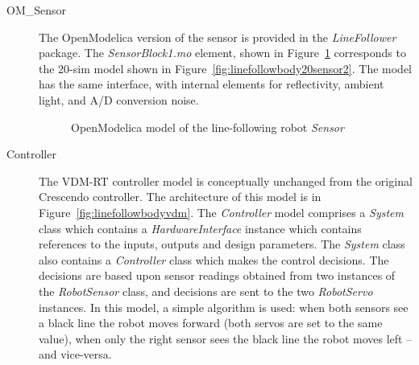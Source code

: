 \begin{description}
\item[OM\_Sensor] The OpenModelica version of the sensor is provided in the \emph{LineFollower} package. The 
\emph{SensorBlock1.mo} element, shown in Figure~\ref{fig:linefollowbodyOMsensor} corresponds to the 20-sim model shown in Figure~\ref{fig:linefollowbody20sensor2}. The model has the same interface, with internal elements for reflectivity, ambient light, and A/D conversion noise.

\begin{figure}[htb!]
\begin{center}
\caption{OpenModelica model of the line-following robot \emph{Sensor}}
\label{fig:linefollowbodyOMsensor}
\end{center}
\end{figure}



\item[Controller] The VDM-RT controller model is conceptually unchanged from the original Crescendo controller. The architecture of this model is in Figure~\ref{fig:linefollowbodyvdm}. The \emph{Controller} model comprises a \emph{System} class which contains a \emph{HardwareInterface} instance which contains references to the inputs, outputs and design parameters. The \emph{System} class also contains a \emph{Controller} class which makes the control decisions. The decisions are based upon sensor readings obtained from two instances of the \emph{RobotSensor} class, and decisions are sent to the two \emph{RobotServo} instances. In this model, a simple algorithm is used: when both sensors see a black line the robot moves forward (both servos are set to the same value), when only the right sensor sees the black line the robot moves left -- and vice-versa.



\end{description}
